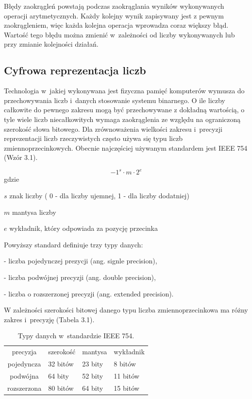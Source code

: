 Błędy zaokrągleń powstają podczas zaokrąglania wyników wykonywanych operacji arytmetycznych. Każdy kolejny wynik zapisywany jest z pewnym zaokrągleniem, więc każda kolejna operacja wprowadza coraz większy błąd. Wartość tego błędu można zmienić w~zależności od liczby wykonywanych lub przy zmianie kolejności działań. 

\subsection{Cyfrowa reprezentacja liczb}\label{sec:numera}

Technologia w~jakiej wykonywana jest fizyczna pamięć komputerów wymusza do przechowywania liczb i~danych stosowanie systemu binarnego. O ile liczby całkowite do pewnego zakresu mogą być przechowywane z dokładną wartością, o tyle wiele liczb niecałkowitych wymaga zaokrąglenia ze względu na ograniczoną szerokość słowa bitowego. Dla zrównoważenia wielkości zakresu i~precyzji reprezentacji liczb rzeczywistych często używa się typu liczb zmiennoprzecinkowych. Obecnie najczęściej używanym standardem jest IEEE 754 (Wzór 3.1).

\begin{equation}
-1^s\cdot m \cdot 2^e
\end{equation}
gdzie
\begin{eqwhere}[2cm]
        \item[$s$]znak liczby ( 0 - dla liczby ujemnej, 1 - dla liczby dodatniej)
        \item[$m$] mantysa liczby
        \item[$e$] wykładnik, który odpowiada za pozycję przecinka 
\end{eqwhere}

Powyższy standard definiuje trzy typy danych:

- liczba pojedynczej prezycji (ang. signle precision),

- liczba podwójnej precyzji (ang. double precision),

- liczba o rozszerzonej precyzji (ang. extended precision).

W zależności szerokości bitowej danego typu liczba zmiennoprzecinkowa ma różny zakres i~precyzję (Tabela 3.1).

\begin{table}[h]
        \centering
        \begin{threeparttable}
                \caption{Typy danych w~standardzie IEEE 754.}\label{tab:table_exampleaz}
                \begin{tabularx}{0.6\textwidth}{| c | X | X | X |}
                        \midrule
                        	precyzja	&	szerokość & mantysa & wykładnik \\
		pojedyncza  & 32 bitów & 23 bity & 8 bitów \\
                        podwójna  & 64 bity & 52 bity & 11 bitów \\
		rozszerzona & 80 bitów & 64 bity & 15 bitów \\
                        \bottomrule
                \end{tabularx}
        \end{threeparttable}
\end{table}

